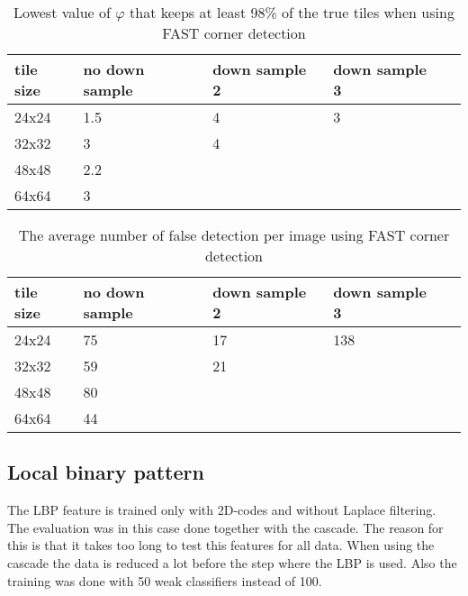\begin{table}[H]
\begin{center}
     \begin{tabular}{ | l | l | l | l | l |}
     \hline
     tile size & no down sample & down sample 2 & down sample 3 \\ \hline
   	 24x24 & 1.5 & 4 & 3 		\\ \hline
     32x32 & 3 & 4 & 			\\ \hline
     48x48 & 2.2 &     &  		\\ \hline
     64x64 & 3 &     &			\\ \hline
     \end{tabular}
\end{center}
\caption{Lowest value of $\varphi$ that keeps at least 98\% of the true tiles when using FAST corner detection}
\end{table}

\begin{table}[H]
\begin{center}
     \begin{tabular}{ | l | l | l | l | l |}
     \hline
     tile size & no down sample & down sample 2 & down sample 3 \\ \hline
   	 24x24 & 75 & 17 & 138		\\ \hline
     32x32 & 59 & 21 & 			\\ \hline
     48x48 & 80    &     &  	\\ \hline
     64x64 & 44     &     &		\\ \hline
     \end{tabular}
\end{center}
\caption{The average number of false detection per image using FAST corner detection}
\end{table}

\subsection{Local binary pattern}
The LBP feature is trained only with 2D-codes and without Laplace filtering. The evaluation was in this case done together with the cascade. The reason for this is that it takes too long to test this features for all data. When using the cascade the data is reduced a lot before the step where the LBP is used. Also the training was done with 50 weak classifiers instead of 100.

